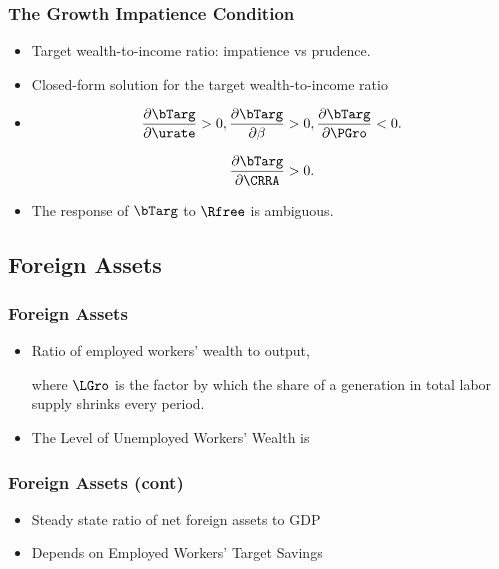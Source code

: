 \documentclass{beamer}
\begin{document}
\begin{frame}
\frametitle{The Growth Impatience Condition}
\begin{itemize}
    \item Target wealth-to-income ratio: impatience vs prudence.

    \item Closed-form solution for the target wealth-to-income ratio

    \item \begin{eqnarray}
\frac{\partial \bTarg}{\partial \urate}>0,
\frac{\partial \bTarg}{\partial \beta}>0,
\frac{\partial \bTarg}{\partial \PGro}<0.
\label{eq:compstat}
\end{eqnarray}


\begin{eqnarray}
\frac{\partial \bTarg}{\partial \CRRA}>0.
\label{eq:db/drho=}
\end{eqnarray}
    \item The response of $\bTarg$ to $\Rfree$ is ambiguous. 
\end{itemize}
\end{frame}



\subsection{Foreign Assets}
\begin{frame}
\frametitle{Foreign Assets}
    \begin{itemize}
    \item Ratio of employed workers' wealth to output,

where $\LGro$ is the factor by which the share of a generation in total labor supply shrinks every period.

    \item The Level of Unemployed Workers' Wealth is 

\end{itemize}
\end{frame}

\begin{frame}\frametitle{Foreign Assets (cont)}
\begin{itemize}
\item Steady state ratio of net foreign assets to GDP
    
\item Depends on Employed Workers' Target Savings
\end{itemize}
\end{frame}
\end{document}
